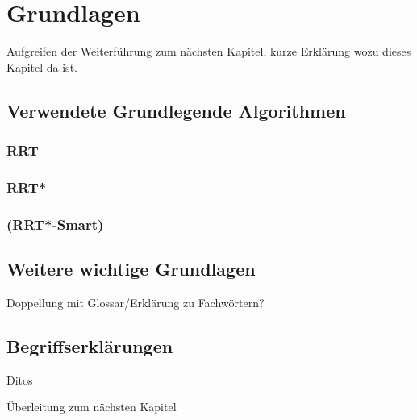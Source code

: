 \section{Grundlagen}
Aufgreifen der Weiterführung zum nächsten Kapitel, kurze Erklärung wozu dieses Kapitel da ist.
\subsection{Verwendete Grundlegende Algorithmen}

\subsubsection{RRT}
\subsubsection{RRT*}
\subsubsection{(RRT*-Smart)}

\subsection{Weitere wichtige Grundlagen}
Doppellung mit Glossar/Erklärung zu Fachwörtern?

\subsection{Begriffserklärungen}
Ditos

Überleitung zum nächsten Kapitel